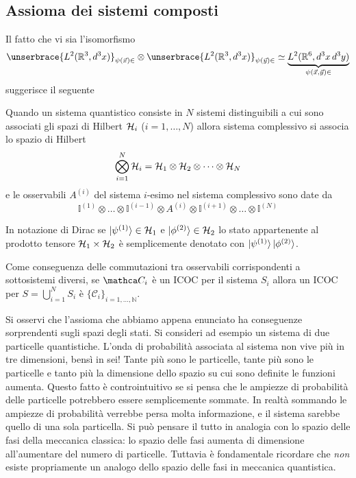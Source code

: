 \documentclass[../../FisicaTeorica.tex]{subfiles}
\begin{document}
\subsection{Assioma dei sistemi composti}

Il fatto che vi sia l’isomorfismo
\[
\unserbrace{L^2(\mathbb R^3, d^3 x)}_{\psi(\vect x) \in} \otimes \unserbrace{L^2(\mathbb R^3, d^3 x)}_{\psi(\vect y) \in} \simeq \underbrace{L^2(\mathbb R^6, d^3 x \, d^3 y)}_{\psi(\vect x, \vect y) \in}
\]
suggerisce il seguente
\begin{axi}
Quando un sistema quantistico consiste in $N$ sistemi distinguibili a cui sono associati gli spazi di Hilbert $\mathcal{H}_i$ ($i = 1, \dots, N$) allora sistema complessivo si associa lo spazio di Hilbert
\[
\bigotimes_{i = 1}^N \mathcal{H}_i = \mathcal{H}_1 \otimes \mathcal{H}_2 \otimes \dots \otimes \mathcal{H}_N
\]
e le osservabili $A^{(i)}$ del sistema $i$-esimo nel sistema complessivo sono date da
\[
\mathbb{I}^{(1)} \otimes \dots \otimes \mathbb{I}^{(i-1)} \otimes A^{(i)} \otimes \mathbb{I}^{(i+1)} \otimes \dots \otimes \mathbb{I}^{(N)}
\]
\end{axi}

\begin{notation}
In notazione di Dirac se $\ket{\psi^{(1)}} \in \mathcal{H}_1$ e $\ket{\phi^{(2)}} \in \mathcal{H}_2$ lo stato appartenente al prodotto tensore $\mathcal{H}_1 \times \mathcal{H}_2$ è semplicemente denotato con $\ket{\psi^{(1)}} \ket{\phi^{(2)}}$.
\end{notation}
\begin{remark}
Come conseguenza delle commutazioni tra osservabili corrispondenti a sottosistemi diversi, se $\mathca C_i$ è un ICOC per il sistema $S_i$ allora un ICOC per $S = \bigcup_{i = 1}^{N} S_i$ è $\{ \mathcal C_i \}_{i = 1, \dots, \mathbb N}$.
\end{remark}

Si osservi che l’assioma che abbiamo appena enunciato ha conseguenze sorprendenti sugli spazi degli stati. Si consideri ad esempio un sistema di due particelle quantistiche. L’onda di probabilità associata al sistema non vive più in tre dimensioni, bensì in sei! Tante più sono le particelle, tante più sono le particelle e tanto più la dimensione dello spazio su cui sono definite le funzioni aumenta. Questo fatto è controintuitivo se si pensa che le ampiezze di probabilità delle particelle potrebbero essere semplicemente sommate. In realtà sommando le ampiezze di probabilità verrebbe persa molta informazione, e il sistema sarebbe quello di una sola particella. %
Si può pensare il tutto in analogia con lo spazio delle fasi della meccanica classica: lo spazio delle fasi aumenta di dimensione all’aumentare del numero di particelle. Tuttavia è fondamentale ricordare che \emph{non} esiste propriamente un analogo dello spazio delle fasi in meccanica quantistica.
\end{document}

